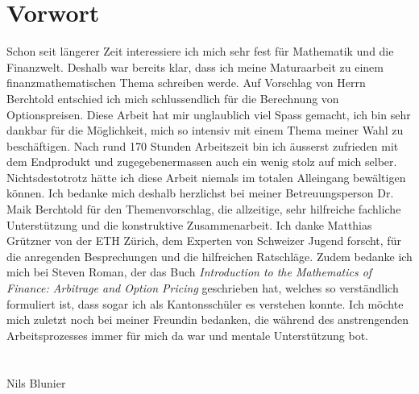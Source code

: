 \documentclass[11pt]{report} %
\begin{document}
\chapter*{Vorwort}
Schon seit längerer Zeit interessiere ich mich sehr fest für Mathematik und die Finanzwelt. Deshalb war bereits klar, dass ich meine Maturaarbeit zu einem finanzmathematischen Thema schreiben werde. Auf Vorschlag von Herrn Berchtold entschied ich mich schlussendlich für die Berechnung von Optionspreisen. Diese Arbeit hat mir unglaublich viel Spass gemacht, ich bin sehr dankbar für die Möglichkeit, mich so intensiv mit einem Thema meiner Wahl zu beschäftigen. Nach rund 170 Stunden Arbeitszeit bin ich äusserst zufrieden mit dem Endprodukt und zugegebenermassen auch ein wenig stolz auf mich selber. Nichtsdestotrotz hätte ich diese Arbeit niemals im totalen Alleingang bewältigen können. Ich bedanke mich deshalb herzlichst bei meiner Betreuungsperson Dr. Maik Berchtold für den Themenvorschlag, die allzeitige, sehr hilfreiche fachliche Unterstützung und die konstruktive Zusammenarbeit. Ich danke Matthias Grützner von der ETH Zürich, dem Experten von Schweizer Jugend forscht, für die anregenden Besprechungen und die hilfreichen Ratschläge. Zudem bedanke ich mich bei Steven Roman, der das Buch \textit{Introduction to the Mathematics of Finance: Arbitrage and Option Pricing} geschrieben hat, welches so verständlich formuliert ist, dass sogar ich als Kantonsschüler es verstehen konnte. Ich möchte mich zuletzt noch bei meiner Freundin bedanken, die während des anstrengenden Arbeitsprozesses immer für mich da war und mentale Unterstützung bot.
\\\\
\\Nils Blunier
\newpage
\tableofcontents
\newpage
\end{document}
